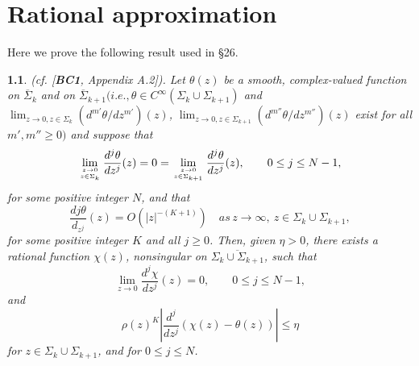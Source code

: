 \documentclass{surv-l}
\theoremstyle{plain}
\newtheorem{prop}[theorem]{\sc{Proposition}}
\theoremstyle{definition}
\numberwithin{equation}{chapter}
\begin{document}
{\appendix
\renewcommand{\thechapter}{\Alph{chapter}}
\setcounter{chapter}{0}
\chapter{Rational approximation}\label{appA}

Here we prove the following result used in \S26.

\begin{prop}\label{propA.1}
\emph{(cf. [\textbf{BC1}, Appendix A.2])}. Let $\theta(z)$ be a smooth, complex-valued function on $\overline{\Sigma}_{k}$ and on $\overline{\Sigma}_{k+1}(i.e., \theta\in C^{\infty}(\Sigma_{k}\cup\Sigma_{k+1})$ and $\lim_{z\rightarrow 0,z\in\Sigma_{k}}(d^{m'}\theta/dz^{m'})(z)$, $\lim_{z\rightarrow 0,z\in\Sigma_{k+1}}(d^{m''}\theta/dz^{m''})(z)$ exist for all $m',m'' \geq 0)$ and suppose that
\setcounter{equation}{1}
\begin{equation}\label{eqA.2}
\displaystyle\lim_{{z\rightarrow0}\atop{z\in\Sigma_{k}}}\frac{d^{j}\theta}{d{z^{j}}}(z)=0=\lim_{{z\rightarrow0}\atop{z\in\Sigma_{k+1}}}\frac{d^{j}\theta}{d{z^{j}}}(z),\qquad 0\leq j\leq N-1,
\end{equation}
for some positive integer $N$, and that
\begin{equation}\label{eqA.3}
\frac{d{j}\theta}{d_{z^{j}}}(z)=O(|z|^{-(K+1)})\quad as\, z\rightarrow\infty,\ z\in\Sigma_{k}\cup\Sigma_{k+1},
\end{equation}
for some positive integer $K$ and all $j\geq 0$. Then, given $\eta>0$, there exists a rational function $\chi(z)$, nonsingular on $\overline{\Sigma_{k}\cup\Sigma_{k+1}}$, such that
\begin{equation}\label{eqA.4}
\lim_{z\rightarrow 0}\frac{d^{j}\chi}{dz^{j}}(z)=0,\qquad 0\leq j\leq N-1,
\end{equation}
and
\begin{equation}\label{eqA.5}
\rho(z)^{K}\left|\frac{d^{j}}{dz^{j}}(\chi(z)-\theta(z))\right|\leq\eta
\end{equation}
for $z\in\Sigma_{k}\cup\Sigma_{k+1}$, and for $0\leq j \leq N$.
\end{prop}

}
\end{document}
